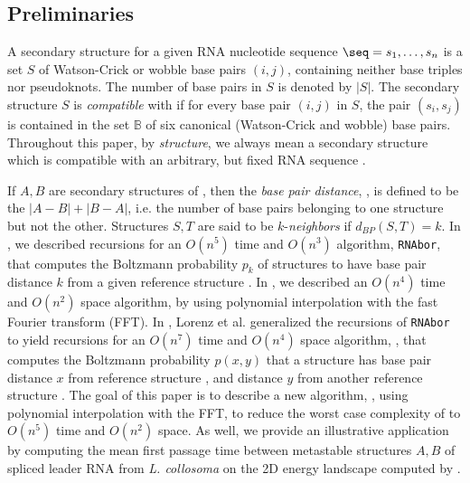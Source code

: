 \subsection{Preliminaries}


A secondary structure for a given RNA nucleotide sequence
$\seq = s_1,\dots,s_n$ is a set $S$ of Watson-Crick or wobble
base pairs $(i,j)$, containing neither base triples nor pseudoknots.
The number of base pairs in $S$ is denoted by $|S|$.
The secondary structure $S$ is {\em compatible}
with \seq if for every base pair $(i,j)$ in $S$, the pair
$(s_i,s_j)$ is contained in the set
$\mathbb{B}$
of six canonical (Watson-Crick and wobble) base pairs.
Throughout this paper, by {\em structure}, we always mean a
secondary structure which is compatible with an arbitrary, but fixed
RNA sequence \seq.

If $A,B$ are secondary structures of \seq, then the {\em base pair distance},
\dBP{\strA}{\strB}, is defined to be the $|A-B|+|B-A|$, i.e. the number of
base pairs belonging to one structure but not the other.
Structures $S,T$ are said to be $k$-{\em neighbors} if $d_{BP}(S,T) = k$.
In \citep{Freyhult.b07}, we described recursions for an $O(n^5)$ time and
$O(n^3)$ algorithm, {\tt RNAbor}, that computes the Boltzmann probability
$p_k$ of structures to have base pair distance $k$ from a given reference
structure \strA. In \citep{fftbor}, we described an $O(n^4)$ time and
$O(n^2)$ space algorithm, by using polynomial interpolation with the
fast Fourier transform (FFT).
In \citep{hofacker:RNAbor2D}, Lorenz et al. generalized
the recursions  of {\tt RNAbor} \citep{Freyhult.b07}
to yield recursions for an $O(n^7)$ time and $O(n^4)$ space
algorithm, \rnatwofold,
that computes the Boltzmann probability $p(x,y)$ that a structure has
base pair distance $x$ from reference structure \strA, and distance
$y$ from another reference structure \strB.
The goal of this paper is to describe a new algorithm, \ffttwo,
using polynomial interpolation with the FFT, to
reduce the worst case complexity of \rnatwofold to
$O(n^5)$ time and $O(n^2)$ space. As well, we provide an
illustrative application by computing the mean first passage time
between metastable structures $A,B$ of spliced leader RNA from
{\em L. collosoma} on the 2D energy landscape computed by \ffttwo.

